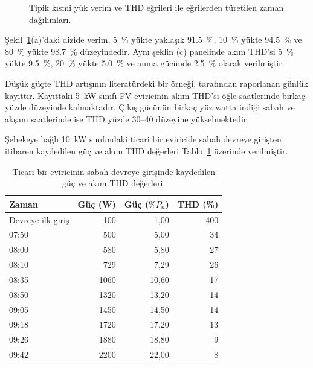 \begin{figure}[H]
  \centering
  
  \caption{Tipik kısmi yük verim ve THD eğrileri ile eğrilerden türetilen zaman dağılımları.}
  \label{fig:fv-verim-thd-profilleri}
\end{figure}

Şekil~\ref{fig:fv-verim-thd-profilleri}(a)'daki dizide verim, \SI{5}{\percent} yükte yaklaşık \SI{91.5}{\percent}, \SI{10}{\percent} yükte \SI{94.5}{\percent} ve \SI{80}{\percent} yükte \SI{98.7}{\percent} düzeyindedir. Aynı şeklin (c) panelinde akım THD'si \SI{5}{\percent} yükte \SI{9.5}{\percent}, \SI{20}{\percent} yükte \SI{5.0}{\percent} ve anma gücünde \SI{2.5}{\percent} olarak verilmiştir.

Düşük güçte THD artışının literatürdeki bir örneği, \citet{Chicco2009} tarafından raporlanan günlük kayıttır. Kayıttaki \SI{5}{\kilo\watt} sınıfı FV eviricinin akım THD'si öğle saatlerinde birkaç yüzde düzeyinde kalmaktadır. Çıkış gücünün birkaç yüz watta indiği sabah ve akşam saatlerinde ise THD yüzde 30--40 düzeyine yükselmektedir.

Şebekeye bağlı \SI{10}{\kilo\watt} sınıfındaki ticari bir eviricide sabah devreye girişten itibaren kaydedilen güç ve akım THD değerleri Tablo~\ref{tab:ticari-evirici-thd} üzerinde verilmiştir.

\begin{table}[H]
  \centering
  \caption{Ticari bir eviricinin sabah devreye girişinde kaydedilen güç ve akım THD değerleri.}
  \label{tab:ticari-evirici-thd}
  \begin{tabular}{lrrr}
    \toprule
    \textbf{Zaman} & \textbf{Güç (W)} & \textbf{Güç ($\%P_n$)} & \textbf{THD (\%)} \\
    \midrule
    Devreye ilk giriş & 100 & 1,00 & 400 \\
    07:50 & 500 & 5,00 & 34 \\
    08:00 & 580 & 5,80 & 27 \\
    08:10 & 729 & 7,29 & 26 \\
    08:35 & 1060 & 10,60 & 17 \\
    08:50 & 1320 & 13,20 & 14 \\
    09:05 & 1450 & 14,50 & 14 \\
    09:18 & 1720 & 17,20 & 13 \\
    09:26 & 1880 & 18,80 & 9 \\
    09:42 & 2200 & 22,00 & 8 \\
    \bottomrule
  \end{tabular}
\end{table}


